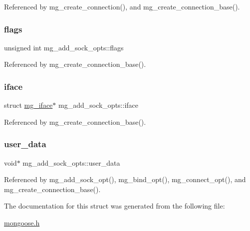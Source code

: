 Referenced by mg\+\_\+create\+\_\+connection(), and mg\+\_\+create\+\_\+connection\+\_\+base().

\mbox{\label{structmg__add__sock__opts_ac836b917617be7c0a38e6a322cdf9cff_ac836b917617be7c0a38e6a322cdf9cff}} 
\subsubsection{\texorpdfstring{flags}{flags}}
{\footnotesize\ttfamily unsigned int mg\+\_\+add\+\_\+sock\+\_\+opts\+::flags}



Referenced by mg\+\_\+create\+\_\+connection\+\_\+base().

\mbox{\label{structmg__add__sock__opts_a3d5516f6481c9a317b4708ec370a9b43_a3d5516f6481c9a317b4708ec370a9b43}} 
\subsubsection{\texorpdfstring{iface}{iface}}
{\footnotesize\ttfamily struct \hyperlink{structmg__iface}{mg\+\_\+iface}$\ast$ mg\+\_\+add\+\_\+sock\+\_\+opts\+::iface}



Referenced by mg\+\_\+create\+\_\+connection\+\_\+base().

\mbox{\label{structmg__add__sock__opts_af927a96c42e76f43592b510eca4e1f8e_af927a96c42e76f43592b510eca4e1f8e}} 
\subsubsection{\texorpdfstring{user\+\_\+data}{user\_data}}
{\footnotesize\ttfamily void$\ast$ mg\+\_\+add\+\_\+sock\+\_\+opts\+::user\+\_\+data}



Referenced by mg\+\_\+add\+\_\+sock\+\_\+opt(), mg\+\_\+bind\+\_\+opt(), mg\+\_\+connect\+\_\+opt(), and mg\+\_\+create\+\_\+connection\+\_\+base().



The documentation for this struct was generated from the following file\+:\begin{DoxyCompactItemize}
\item 
\hyperlink{mongoose_8h}{mongoose.\+h}\end{DoxyCompactItemize}
